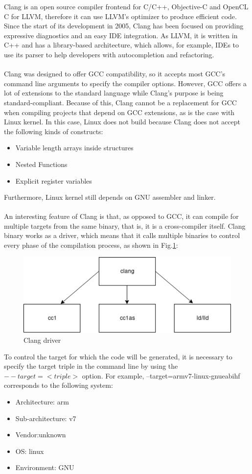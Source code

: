\documentclass[12pt,a4paper,oneside]{article}
\begin{document}
Clang is an open source compiler frontend for C/C++, Objective-C and OpenCL C
for LLVM, therefore it can use LLVM's optimizer to produce efficient code. Since
the start of its development in 2005, Clang has been focused on providing
expressive diagnostics and an easy IDE integration. As LLVM, it is written in
C++ and has a library-based architecture, which allows, for example, IDEs to use
its parser to help developers with autocompletion and refactoring.\\\\
Clang was designed to offer GCC compatibility, so it accepts most GCC's command
line arguments to specify the compiler options. However, GCC offers a lot of
extensions to the standard language while Clang's purpose is being
standard-compliant. Because of this, Clang cannot be a replacement for GCC when
compiling projects that depend on GCC extensions, as is the case with Linux kernel.
In this case, Linux does not build because Clang does not accept the following
kinds of constructs:
\begin{itemize}
  \item Variable length arrays inside structures
  \item Nested Functions
  \item Explicit register variables
\end{itemize}
Furthermore, Linux kernel still depends on GNU assembler and linker.\\\\
An interesting feature of Clang is that, as opposed to GCC, it can compile
for multiple targets from the same binary, that is, it is a cross-compiler itself.
Clang binary works as a driver, which means that it calls multiple binaries to
control every phase of the compilation process, as shown in Fig.\ref{fig:clang_driver}:

\begin{figure}[H]
\centering
  \includegraphics[scale=0.75]{img/clang_driver.png}
  \caption{Clang driver}
  \label{fig:clang_driver}
\end{figure}
To control the target for which the code will be generated, it is necessary to
specify the target triple in the command line by using the $--target=<triple>$
option. For example, {\selectfont --target=armv7-linux-gnueabihf}
corresponds to the following system:
\begin{itemize}
  \item Architecture: arm
  \item Sub-architecture: v7
  \item Vendor:unknown
  \item OS: linux
  \item Environment: GNU
\end{itemize}
\end{document}
